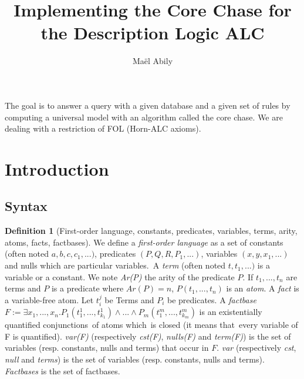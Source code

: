 \documentclass{article}
\title{Implementing the Core Chase for the Description Logic ALC}
\author{Maël Abily}	%
\theoremstyle{definition}
\newtheorem{definition}{Definition}[section]
\theoremstyle{remark}
\begin{document}
\maketitle						%



\begin{comment}
I modified : definition of atom, the first remark, definition 2 and 3 (including the definition of core),exemple of core, proof of proposal 1.2, the def of $Tr_{T}(F)$, the last exemple and the def of universal model.
\end{comment}

The goal is to answer a query with a given database and a given set of rules by computing a universal model with an algorithm called the core chase. We are dealing with a restriction of FOL (Horn-ALC axioms).

\tableofcontents					%
\section{Introduction}

\subsection{Syntax}

\begin{definition}[First-order language, constants, predicates, variables, terms, arity, atoms, facts, factbases] We define a \emph{first-order language} as a set of constants (often noted $a,b,c,c_{1},...)$, predicates $(P,Q,R,P_{1},...)$, variables $(x,y,x_{1},...)$ and nulls which are particular variables.\ A \emph{term}  (often noted $t,t_{1},...)$ is a variable or a constant. We note \emph{Ar(P)} the arity of the predicate $P$. 
 If $t_1,...,t_n$ are terms and $P$ is a predicate where $Ar(P) = n$,  $P(t_{1},...,t_{n})$ is an \emph{atom}. A \emph{fact} is a variable-free atom. Let $t_i^j$ be Terms and $P_i$ be predicates. A \emph{factbase} $F := \exists x_{1},...,x_{n}.P_{1}(t_{1}^{1},...,t_{k_{1}}^{1})\land ...\land P_{m}(t_{1}^{m},...,t_{k_{m}}^{m})$ is an existentially quantified conjunctions\ of atoms which\ is closed (it means that\ every variable of F is quantified). \emph{var(F)} (respectively \emph{cst(F)}, \emph{nulls(F)} and \emph{term(F)}) is the set of variables (resp. constants, nulls and terms) that occur in $F$. \emph{var} (respectively \emph{cst}, \emph{null} and \emph{terms}) is the set of variables (resp. constants, nulls and terms). \emph{Factbases} is the set of factbases.
\end{definition}
\end{document}

